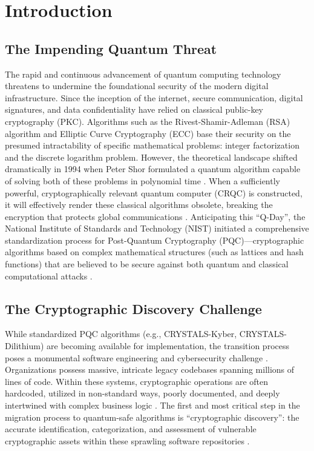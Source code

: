 \documentclass[conference]{IEEEtran}
\begin{document}
\section{Introduction}

\subsection{The Impending Quantum Threat}
The rapid and continuous advancement of quantum computing technology threatens to undermine the foundational security of the modern digital infrastructure. Since the inception of the internet, secure communication, digital signatures, and data confidentiality have relied on classical public-key cryptography (PKC). Algorithms such as the Rivest-Shamir-Adleman (RSA) algorithm and Elliptic Curve Cryptography (ECC) base their security on the presumed intractability of specific mathematical problems: integer factorization and the discrete logarithm problem. However, the theoretical landscape shifted dramatically in 1994 when Peter Shor formulated a quantum algorithm capable of solving both of these problems in polynomial time \cite{shor1994}. When a sufficiently powerful, cryptographically relevant quantum computer (CRQC) is constructed, it will effectively render these classical algorithms obsolete, breaking the encryption that protects global communications \cite{mosca2018}. Anticipating this ``Q-Day'', the National Institute of Standards and Technology (NIST) initiated a comprehensive standardization process for Post-Quantum Cryptography (PQC)---cryptographic algorithms based on complex mathematical structures (such as lattices and hash functions) that are believed to be secure against both quantum and classical computational attacks \cite{nist2022}.

\subsection{The Cryptographic Discovery Challenge}
While standardized PQC algorithms (e.g., CRYSTALS-Kyber, CRYSTALS-Dilithium) are becoming available for implementation, the transition process poses a monumental software engineering and cybersecurity challenge \cite{barker2019}. Organizations possess massive, intricate legacy codebases spanning millions of lines of code. Within these systems, cryptographic operations are often hardcoded, utilized in non-standard ways, poorly documented, and deeply intertwined with complex business logic \cite{chen2016}. The first and most critical step in the migration process to quantum-safe algorithms is ``cryptographic discovery'': the accurate identification, categorization, and assessment of vulnerable cryptographic assets within these sprawling software repositories \cite{halderman2012}.
\end{document}
